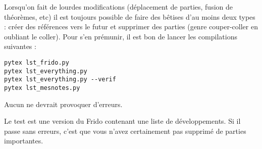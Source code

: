 Lorsqu'on fait de lourdes modifications (déplacement de parties, fusion de théorèmes, etc) il est toujours possible de faire des bêtises d'au moins deux types : créer des références vers le futur et supprimer des parties (genre couper-coller en oubliant le coller). Pour s'en prémunir, il est bon de lancer les compilations suivantes :
\begin{verbatim}
pytex lst_frido.py
pytex lst_everything.py 
pytex lst_everything.py --verif
pytex lst_mesnotes.py 
\end{verbatim}
Aucun ne devrait provoquer d'erreurs.

Le test  est une version du Frido contenant une liste de développements. Si il passe sans erreurs, c'est que vous n'avez certainement pas supprimé de parties importantes.


